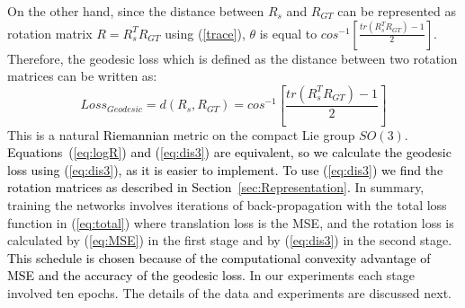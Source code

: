 \documentclass[journal,transmag]{IEEEtran}
\begin{document}
On the other hand, since the distance between $R_s$ and $R_{GT}$ can be represented as rotation matrix $R=R_s^TR_{GT}$ using (\ref{trace}), $\theta$ is equal to $cos^{-1}\left [ \frac{tr(R_s^TR_{GT})-1}{2} \right ]$. Therefore, the geodesic loss which is defined as the distance between two rotation matrices can be written as:
\begin{equation}
    Loss_{Geodesic} = d(R_s, R_{GT}) = cos^{-1}\left [ \frac{tr(R_s^TR_{GT})-1}{2} \right ]
    \label{eq:dis3}
\end{equation}
This is a natural \textcolor{black}{Riemannian} metric on the compact Lie group $SO(3)$. \textcolor{black}{Equations~(\ref{eq:logR}) and (\ref{eq:dis3}) are equivalent, so we calculate the geodesic loss using (\ref{eq:dis3}), as it is easier to implement. To use (\ref{eq:dis3}) we find the rotation matrices as described in Section~\ref{sec:Representation}.} In summary, training the networks involves iterations of back-propagation with the total loss function in (\ref{eq:total}) where translation loss is the MSE, and the rotation loss is calculated by (\ref{eq:MSE}) in the first stage and by (\ref{eq:dis3}) in the second stage. \textcolor{black}{This schedule is chosen because of the computational convexity advantage of MSE and the accuracy of the geodesic loss.} In our experiments each stage involved ten epochs. The details of the data and experiments are discussed next.


\end{document}
